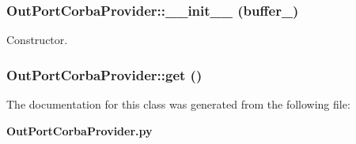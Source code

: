 \subsubsection{\setlength{\rightskip}{0pt plus 5cm}Out\-Port\-Corba\-Provider::\_\-\_\-init\_\-\_\- (buffer\_\-)}\label{classOutPortCorbaProvider_OutPortCorbaProvidera0}


Constructor. 

\subsubsection{\setlength{\rightskip}{0pt plus 5cm}Out\-Port\-Corba\-Provider::get ()}\label{classOutPortCorbaProvider_OutPortCorbaProvidera2}




The documentation for this class was generated from the following file:\begin{CompactItemize}
\item 
{\bf Out\-Port\-Corba\-Provider.py}\end{CompactItemize}
